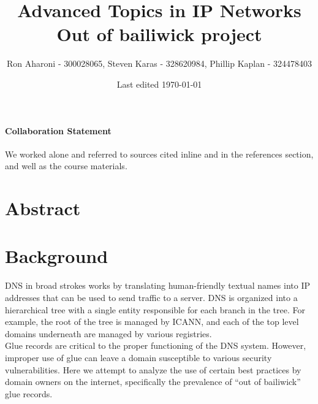 \documentclass{idc_msc}
\title{Advanced Topics in IP Networks \\\large Out of bailiwick project}
\date{Last edited \today}
\author{Ron Aharoni\texorpdfstring{ - 300028065}{}, Steven Karas\texorpdfstring{ - 328620984}{}, Phillip Kaplan\texorpdfstring{ - 324478403}{}}
\begin{document}
\paragraph{Collaboration Statement}
  We worked alone and referred to sources cited inline and in the references section, and well as the course materials.


\section{Abstract}

\section{Background}


DNS in broad strokes works by translating human-friendly textual names into IP addresses that can be used to send traffic to a server.
DNS is organized into a hierarchical tree with a single entity responsible for each branch in the tree.
For example, the root of the tree is managed by ICANN, and each of the top level domains underneath are managed by various registries.\\
Glue records are critical to the proper functioning of the DNS system\cite{rfc1033}. However, improper use of glue can leave a domain susceptible to various security vulnerabilities. Here we attempt to analyze the use of certain best practices by domain owners on the internet, specifically the prevalence of “out of bailiwick” glue records.
\end{document}
